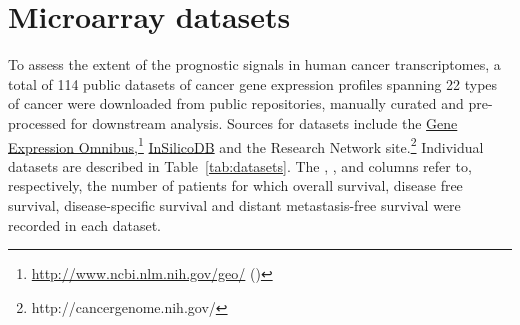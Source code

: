 \section{Microarray datasets}
\label{sec:methods-datasets}

To assess the extent of the prognostic signals in human cancer transcriptomes, a
total of 114 public datasets of cancer gene expression profiles spanning 22
types of cancer were downloaded from public repositories, manually curated and
pre-processed for downstream analysis.  Sources for datasets include the
\href{http://www.ncbi.nlm.nih.gov/geo/}{Gene Expression
  Omnibus},\footnote{\url{http://www.ncbi.nlm.nih.gov/geo/}
  (\citealp{edgar_gene_2002})}
\href{https://insilicodb.com/}{InSilicoDB}\cite{taminau_insilicodb:_2011} and
the  Research Network
site.\footnote{http://cancergenome.nih.gov/}  Individual datasets are described
in Table~\ref{tab:datasets}.  The , ,
 and  columns refer to, respectively, the number
of patients for which overall survival, disease free survival, disease-specific
survival and distant metastasis-free survival were recorded in each dataset.

